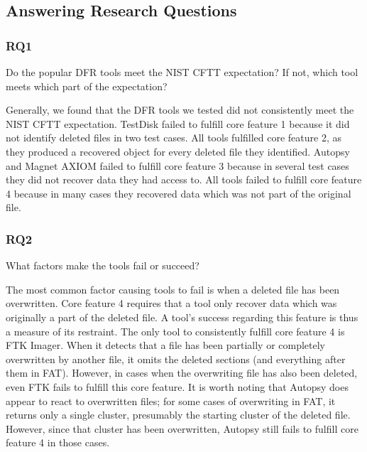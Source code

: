 \documentclass{ws-rv9x6}
\newenvironment{paraphrase}{\color{blue}}{\color{black}} %
\begin{document}
\subsection{Answering Research Questions}

\begin{paraphrase}
 \subsubsection{RQ1}
Do the popular DFR tools meet the NIST CFTT expectation? 
If not, which tool meets which part of the expectation? 

Generally, we found that the DFR tools we tested did not consistently meet the NIST CFTT expectation.
TestDisk failed to fulfill core feature 1 because it did not identify deleted files in two test cases.
All tools fulfilled core feature 2, as they produced a recovered object for every deleted file they identified.
Autopsy and Magnet AXIOM failed to fulfill core feature 3 because in several test cases they did not recover data they had access to.
All tools failed to fulfill core feature 4 because in many cases they recovered data which was not part of the original file.

\subsubsection{RQ2}
What factors make the tools fail or succeed?

The most common factor causing tools to fail is when a deleted file has been overwritten.
Core feature 4 requires that a tool only recover data which was originally a part of the deleted file.
A tool's success regarding this feature is thus a measure of its restraint.
The only tool to consistently fulfill core feature 4 is FTK Imager.
When it detects that a file has been partially or completely overwritten by another file, it omits the deleted sections (and everything after them in FAT).
However, in cases when the overwriting file has also been deleted, even FTK fails to fulfill this core feature.
It is worth noting that Autopsy does appear to react to overwritten files; for some cases of overwriting in FAT, it returns only a single cluster, presumably the starting cluster of the deleted file.
However, since that cluster has been overwritten, Autopsy still fails to fulfill core feature 4 in those cases.


\end{paraphrase}
\end{document}
